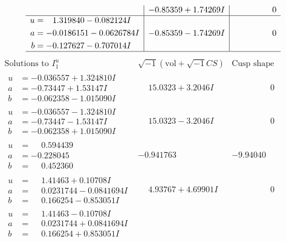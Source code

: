 \documentclass[1p]{elsarticle_modified}
\theoremstyle{definition}
\newcommand{\I}{\sqrt{-1}}
\begin{document}
$$\begin{array}{c|c|c}
 & -0.85359 + 1.74269 I & \phantom{-0.000000 } 0 \\ \hline\begin{aligned}
u &= \phantom{-}1.319840 - 0.082124 I \\
a &= -0.0186151 - 0.0626784 I \\
b &= -0.127627 - 0.707014 I\end{aligned}
 & -0.85359 - 1.74269 I & \phantom{-0.000000 } 0\\
 \hline 
 \end{array}$$\newpage$$\begin{array}{c|c|c}  
\text{Solutions to }I^u_{1}& \I (\text{vol} + \sqrt{-1}CS) & \text{Cusp shape}\\
 \hline 
\begin{aligned}
u &= -0.036557 + 1.324810 I \\
a &= -0.73447 + 1.53147 I \\
b &= -0.062358 - 1.015090 I\end{aligned}
 & \phantom{-}15.0323 + 3.2046 I & \phantom{-0.000000 } 0 \\ \hline\begin{aligned}
u &= -0.036557 - 1.324810 I \\
a &= -0.73447 - 1.53147 I \\
b &= -0.062358 + 1.015090 I\end{aligned}
 & \phantom{-}15.0323 - 3.2046 I & \phantom{-0.000000 } 0 \\ \hline\begin{aligned}
u &= \phantom{-}0.594439\phantom{ +0.000000I} \\
a &= -0.228045\phantom{ +0.000000I} \\
b &= \phantom{-}0.452360\phantom{ +0.000000I}\end{aligned}
 & -0.941763\phantom{ +0.000000I} & -9.94040\phantom{ +0.000000I} \\ \hline\begin{aligned}
u &= \phantom{-}1.41463 + 0.10708 I \\
a &= \phantom{-}0.0231744 - 0.0841694 I \\
b &= \phantom{-}0.166254 - 0.853051 I\end{aligned}
 & \phantom{-}4.93767 + 4.69901 I & \phantom{-0.000000 } 0 \\ \hline\begin{aligned}
u &= \phantom{-}1.41463 - 0.10708 I \\
a &= \phantom{-}0.0231744 + 0.0841694 I \\
b &= \phantom{-}0.166254 + 0.853051 I\end{aligned}

\end{array}$$
\end{document}
